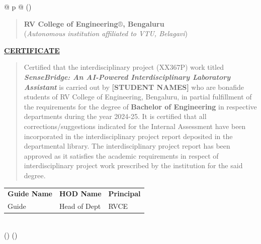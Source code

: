 \documentclass[]{article}
\begin{document}
\newpage

\begin{longtable}[]{@{} p{\textwidth} @{}}
\toprule()
\begin{minipage}[b]{\linewidth}\raggedright
\begin{quote}
\textbf{RV College of Engineering}®\textbf{, Bengaluru} \\
(\emph{Autonomous institution affiliated to VTU, Belagavi})
\end{quote}

\centering
\textbf{\uline{CERTIFICATE}} \\
\vspace{0.5cm}
\begin{quote}
Certified that the interdisciplinary project (XX367P) work titled \\
\emph{\textbf{SenseBridge: An AI-Powered Interdisciplinary Laboratory Assistant}} is carried out by \textbf{[STUDENT NAMES]} who are bonafide students of RV College of Engineering, Bengaluru, in partial fulfillment of the requirements for the degree of \textbf{Bachelor of Engineering} in respective departments during the year 2024-25. It is certified that all corrections/suggestions indicated for the Internal Assessment have been incorporated in the interdisciplinary project report deposited in the departmental library. The interdisciplinary project report has been approved as it satisfies the academic requirements in respect of interdisciplinary project work prescribed by the institution for the said degree.
\end{quote}

\vspace{1.5cm}
\begin{tabular}{lll}
    \textbf{Guide Name} & \textbf{HOD Name} & \textbf{Principal} \\
    Guide & Head of Dept & RVCE
\end{tabular}
\end{minipage} \\
\midrule()
\endhead
\bottomrule()
\end{longtable}

\newpage
\end{document}
